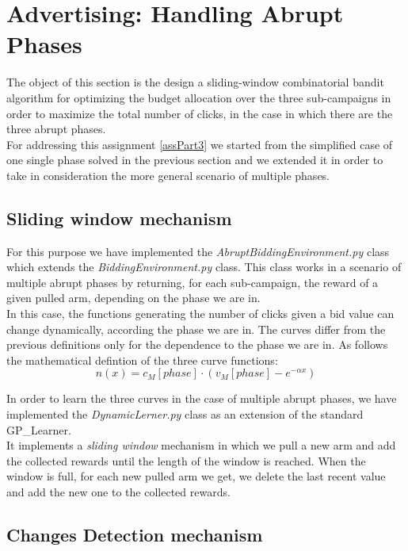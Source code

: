 \chapter{Advertising: Handling Abrupt Phases}

The object of this section is the design a sliding-window combinatorial bandit algorithm for optimizing the budget allocation over the three sub-campaigns in order to maximize the total number of clicks, in the case in which there are the three abrupt phases.\\
For addressing this assignment \ref{assPart3} we started from the simplified case of one single phase solved in the previous section and we extended it in order to take in consideration the more general scenario of multiple phases.\\

\section{Sliding window mechanism}
For this purpose we have implemented the \textit{AbruptBiddingEnvironment.py} class which extends the \textit{BiddingEnvironment.py} class. This class works in a scenario of multiple abrupt phases by returning, for each sub-campaign, the reward of a given pulled arm, depending on the phase we are in.\\

In this case, the functions generating  the number of clicks given a bid value can change dynamically, according the phase we are in.
The curves differ from the previous definitions only for the dependence to the phase we are in. As follows the mathematical defintion of the three curve functions:
\begin{equation}
	n(x) = c_{M}[phase] \cdot (v_{M}[phase] - e^{-\alpha x})
\end{equation}

In order to learn the three curves in the case of multiple abrupt phases, we have implemented the \textit{DynamicLerner.py} class as an extension of the standard GP\_Learner.\\
It implements a \textit{sliding window} mechanism in which we pull a new arm and add the collected rewards until the length of the window is reached. When the window is full, for each new pulled arm we get, we delete the last recent value and add the new one to the collected rewards.

\section{Changes Detection mechanism}

